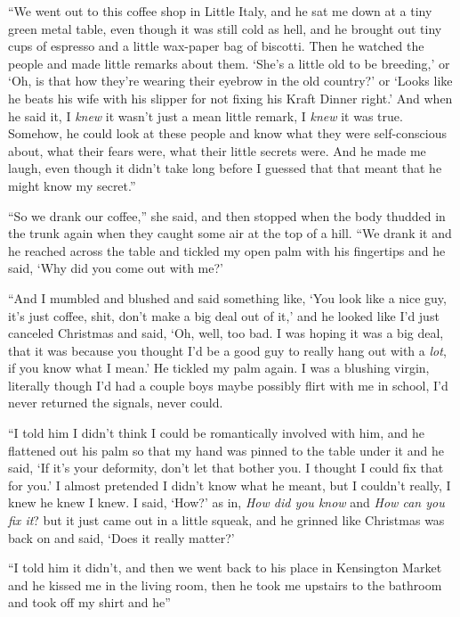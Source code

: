 ``We went out to this coffee shop in Little Italy, and he sat me down
at a tiny green metal table, even though it was still cold as hell,
and he brought out tiny cups of espresso and a little wax-paper bag of
biscotti.  Then he watched the people and made little remarks about
them.  `She's a little old to be breeding,' or `Oh, is that how
they're wearing their eyebrow in the old country?' or `Looks like he
beats his wife with his slipper for not fixing his Kraft Dinner
right.' And when he said it, I \textit{knew} it wasn't just a mean
little remark, I \textit{knew} it was true.  Somehow, he could look at
these people and know what they were self-conscious about, what their
fears were, what their little secrets were.  And he made me laugh,
even though it didn't take long before I guessed that that meant that
he might know my secret.''

``So we drank our coffee,'' she said, and then stopped when the body
thudded in the trunk again when they caught some air at the top of a
hill.  ``We drank it and he reached across the table and tickled my
open palm with his fingertips and he said, `Why did you come out with
me?'

``And I mumbled and blushed and said something like, `You look like a
nice guy, it's just coffee, shit, don't make a big deal out of it,'
and he looked like I'd just canceled Christmas and said, `Oh, well,
too bad.  I was hoping it was a big deal, that it was because you
thought I'd be a good guy to really hang out with a \textit{lot}, if
you know what I mean.' He tickled my palm again.  I was a blushing
virgin, literally though I'd had a couple boys maybe possibly flirt
with me in school, I'd never returned the signals, never could.

``I told him I didn't think I could be romantically involved with him,
and he flattened out his palm so that my hand was pinned to the table
under it and he said, `If it's your deformity, don't let that bother
you.  I thought I could fix that for you.' I almost pretended I didn't
know what he meant, but I couldn't really, I knew he knew I knew.  I
said, `How?' as in, \textit{How did you know} and \textit{How can you
fix it}?  but it just came out in a little squeak, and he grinned like
Christmas was back on and said, `Does it really matter?'

``I told him it didn't, and then we went back to his place in
Kensington Market and he kissed me in the living room, then he took me
upstairs to the bathroom and took off my shirt and he\dash{}''

